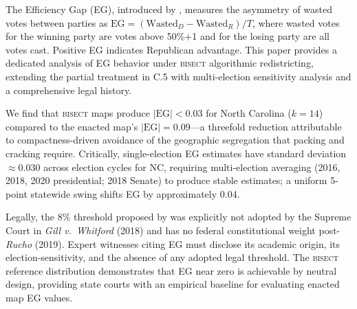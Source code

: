 The Efficiency Gap (EG), introduced by \citet{stephanopoulosMcGhee2015}, measures the
asymmetry of wasted votes between parties as $\text{EG} = (\text{Wasted}_D - \text{Wasted}_R)/T$,
where wasted votes for the winning party are votes above 50\%+1 and for the losing party are all
votes cast. Positive EG indicates Republican advantage. This paper provides a dedicated analysis
of EG behavior under \textsc{bisect} algorithmic redistricting, extending the partial treatment
in C.5 with multi-election sensitivity analysis and a comprehensive legal history.

We find that \textsc{bisect} maps produce $|\text{EG}| < 0.03$ for North Carolina ($k=14$)
compared to the enacted map's $|\text{EG}| = 0.09$---a threefold reduction attributable to
compactness-driven avoidance of the geographic segregation that packing and cracking require.
Critically, single-election EG estimates have standard deviation $\approx 0.030$ across election
cycles for NC, requiring multi-election averaging (2016, 2018, 2020 presidential; 2018 Senate)
to produce stable estimates; a uniform 5-point statewide swing shifts EG by approximately 0.04.

Legally, the 8\% threshold proposed by \citealt{stephanopoulosMcGhee2015} was explicitly not
adopted by the Supreme Court in \textit{Gill v.\ Whitford} (2018) and has no federal constitutional
weight post-\textit{Rucho} (2019). Expert witnesses citing EG must disclose its academic origin,
its election-sensitivity, and the absence of any adopted legal threshold. The \textsc{bisect}
reference distribution demonstrates that EG near zero is achievable by neutral design,
providing state courts with an empirical baseline for evaluating enacted map EG values.
